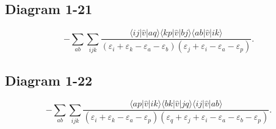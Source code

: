 \documentclass[aps,preprint,amsmath,amssymb]{revtex4-1}
\begin{document}
\subsection*{Diagram 1-21}
\[
-\sum_{ab}\sum_{ijk}\frac{\langle ij| \hat{v} |aq  \rangle \langle kp| \hat{v} |bj  \rangle \langle ab| \hat{v} |ik  \rangle }{(\varepsilon_i+\varepsilon_k-\varepsilon_a-\varepsilon_b) (\varepsilon_j+\varepsilon_i-\varepsilon_a-\varepsilon_p)}.
\]



\subsection*{Diagram 1-22}
\[
-\sum_{ab}\sum_{ijk}\frac{\langle ap| \hat{v} |ik  \rangle \langle bk| \hat{v} |jq  \rangle \langle ij| \hat{v} |ab  \rangle }{(\varepsilon_i+\varepsilon_k-\varepsilon_a-\varepsilon_p) (\varepsilon_q+\varepsilon_j+\varepsilon_i-\varepsilon_a-\varepsilon_b-\varepsilon_p)}.
\]
\end{document}
